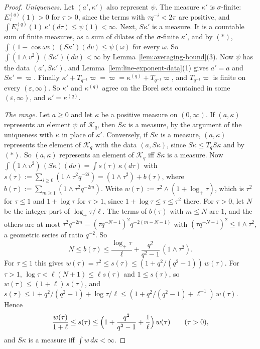 \begin{proof}
\emph{Uniqueness.} Let $(a', \kappa')$ also represent $\psi$. The measure $\kappa'$ is
$\sigma$-finite: $E^{(q)}_\tau(1) > 0$ for $\tau > 0$, since the terms with $\tau q^{-i} < 2\pi$ are
positive, and $\int E^{(q)}_\tau(1)\,\kappa'(d\tau) \le \psi(1) < \infty$. Next, $S\kappa'$ is a
\Levy{} measure. It is a countable sum of finite measures, as a sum of dilates of the
$\sigma$-finite $\kappa'$, and by $(*)$, $\int(1 - \cos\omega v)\,(S\kappa')(dv) \le \psi(\omega)$
for every $\omega$. So $\int(1 \wedge v^2)\,(S\kappa')(dv) < \infty$ by
Lemma~\ref{lem:averaging-bound}(3). Now $\psi$ has the data $(a', S\kappa')$,
and Lemma~\ref{lem:line-exponent-data}(1) gives $a' = a$ and $S\kappa' = \varpi$. Finally
$\kappa' + T_{q^{-1}}\varpi = \varpi = \kappa^{(q)} + T_{q^{-1}}\varpi$, and $T_{q^{-1}}\varpi$ is
finite on every $(\varepsilon,\infty)$. So $\kappa'$ and $\kappa^{(q)}$ agree on the Borel sets
contained in some $(\varepsilon,\infty)$, and $\kappa' = \kappa^{(q)}$.

\emph{The range.} Let $a \ge 0$ and let $\kappa$ be a positive measure on $(0,\infty)$. If
$(a, \kappa)$ represents an element $\psi$ of $\mathcal{K}_q$, then $S\kappa$ is a \Levy{} measure, by
the argument of the uniqueness with $\kappa$ in place of $\kappa'$. Conversely, if $S\kappa$ is a
\Levy{} measure, $(a, \kappa)$ represents the element of $\mathcal{K}_q$ with the data
$(a, S\kappa)$, since $S\kappa \le T_qS\kappa$ and by $(*)$. So $(a, \kappa)$ represents an element
of $\mathcal{K}_q$ iff $S\kappa$ is a \Levy{} measure. Now
$\int(1 \wedge v^2)\,(S\kappa)(dv) = \int s(\tau)\,\kappa(d\tau)$ with
$s(\tau) := \sum_{i \ge 0}(1 \wedge \tau^2q^{-2i}) = (1 \wedge \tau^2) + b(\tau)$, where
$b(\tau) := \sum_{m \ge 1}(1 \wedge \tau^2q^{-2m})$. Write $w(\tau) := \tau^2 \wedge (1 + \log_+\tau)$,
which is $\tau^2$ for $\tau \le 1$ and $1 + \log\tau$ for $\tau > 1$, since
$1 + \log\tau \le \tau \le \tau^2$ there. For $\tau > 0$, let $N$ be the integer part of
$\log_+\tau/\ell$. The terms of $b(\tau)$ with $m \le N$ are $1$, and the others are at most
$\tau^2q^{-2m} = (\tau q^{-N-1})^2q^{-2(m - N - 1)}$ with $(\tau q^{-N-1})^2 \le 1 \wedge \tau^2$, a
geometric series of ratio $q^{-2}$. So
\[
  N \le b(\tau) \le \frac{\log_+\tau}{\ell} + \frac{q^2}{q^2 - 1}\,(1 \wedge \tau^2) .
\]
For $\tau \le 1$ this gives $w(\tau) = \tau^2 \le s(\tau) \le (1 + q^2/(q^2 - 1))\,w(\tau)$. For
$\tau > 1$, $\log\tau < \ell(N + 1) \le \ell s(\tau)$ and $1 \le s(\tau)$, so
$w(\tau) \le (1 + \ell)\,s(\tau)$, and $s(\tau) \le 1 + q^2/(q^2 - 1) + \log\tau/\ell
\le (1 + q^2/(q^2 - 1) + \ell^{-1})\,w(\tau)$. Hence
\[
  \frac{w(\tau)}{1 + \ell} \le s(\tau) \le \Bigl(1 + \frac{q^2}{q^2 - 1} + \frac1\ell\Bigr)\,w(\tau)
  \qquad (\tau > 0),
\]
and $S\kappa$ is a \Levy{} measure iff $\int w\,d\kappa < \infty$.


\end{proof}
